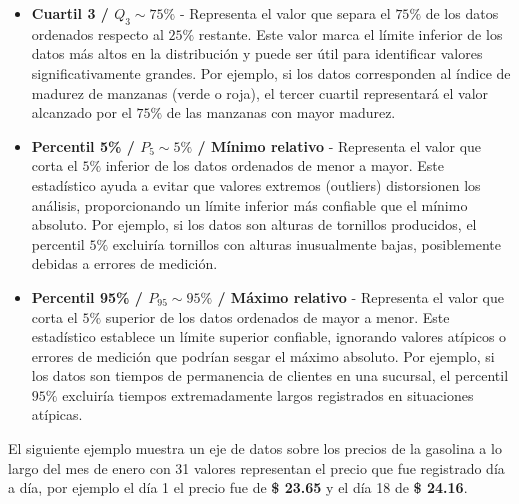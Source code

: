 \documentclass{article}
\begin{document}
\begin{itemize}
    \item \textbf{Cuartil 3 / $Q_3 \sim 75\%$} - Representa el valor que separa el $75\%$ de los datos ordenados respecto al $25\%$ restante. Este valor marca el límite inferior de los datos más altos en la distribución y puede ser útil para identificar valores significativamente grandes. Por ejemplo, si los datos corresponden al índice de madurez de manzanas (verde o roja), el tercer cuartil representará el valor alcanzado por el $75\%$ de las manzanas con mayor madurez.
    \item \textbf{Percentil 5\% / $P_{5} \sim 5\%$ / Mínimo relativo} - Representa el valor que corta el $5\%$ inferior de los datos ordenados de menor a mayor. Este estadístico ayuda a evitar que valores extremos (outliers) distorsionen los análisis, proporcionando un límite inferior más confiable que el mínimo absoluto. Por ejemplo, si los datos son alturas de tornillos producidos, el percentil $5\%$ excluiría tornillos con alturas inusualmente bajas, posiblemente debidas a errores de medición.
    \item \textbf{Percentil 95\% / $P_{95} \sim 95\%$ / Máximo relativo} - Representa el valor que corta el $5\%$ superior de los datos ordenados de mayor a menor. Este estadístico establece un límite superior confiable, ignorando valores atípicos o errores de medición que podrían sesgar el máximo absoluto. Por ejemplo, si los datos son tiempos de permanencia de clientes en una sucursal, el percentil $95\%$ excluiría tiempos extremadamente largos registrados en situaciones atípicas.
\end{itemize}
El siguiente ejemplo muestra un eje de datos sobre los precios de la gasolina a lo largo del mes de enero con 31 valores representan el precio que fue registrado día a día, por ejemplo el día 1 el precio fue de \textbf{\$ 23.65} y el día 18 de \textbf{\$ 24.16}.
\end{document}
